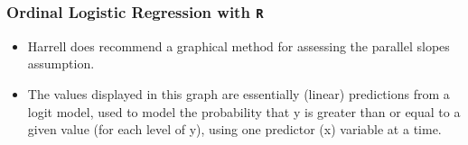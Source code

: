 \documentclass[00-GLMregslides.tex]{subfiles}
\begin{document}
\begin{frame}[fragile]
\frametitle{Ordinal Logistic Regression with \texttt{R}}
\Large
\begin{itemize}		
\item  Harrell does recommend a graphical method for assessing the parallel slopes assumption. 
\item The values displayed in this graph are essentially (linear) predictions from a logit model, used to model the probability that y is greater than or equal to a given value (for each level of y), using one predictor (x) variable at a time. 
\end{itemize}
\end{frame}
\end{document}

